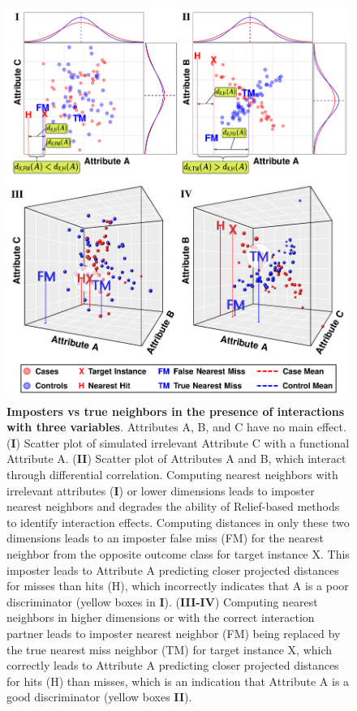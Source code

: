 \documentclass[10pt,letterpaper]{article}
\begin{document}
\begin{figure}[H]
	\centering
	\includegraphics[width=\textwidth]{2by2_arrangementABC.pdf}
	\caption{{\bf Imposters vs true neighbors in the presence of interactions with three variables}. Attributes A, B, and C have no main effect. (\textbf{\selectfont I}) Scatter plot of simulated irrelevant Attribute C with a functional Attribute A. (\textbf{\selectfont II}) Scatter plot of Attributes A and B, which interact through differential correlation. Computing nearest neighbors with irrelevant attributes (\textbf{\selectfont I}) or lower dimensions leads to imposter nearest neighbors and degrades the ability of Relief-based methods to identify interaction effects. Computing distances in only these two dimensions leads to an imposter false miss (FM) for the nearest neighbor from the opposite outcome class for target instance X. This imposter leads to Attribute A predicting closer projected distances for misses than hits (H), which incorrectly indicates that A is a poor discriminator (yellow boxes in \textbf{\selectfont I}). (\textbf{\selectfont III-IV}) Computing nearest neighbors in higher dimensions or with the correct interaction partner leads to imposter nearest neighbor (FM) being replaced by the true nearest miss neighbor (TM) for target instance X, which correctly leads to Attribute A predicting closer projected distances for hits (H) than misses, which is an indication that Attribute A is a good discriminator (yellow boxes \textbf{\selectfont II}).}\label{fig:ABC}
\end{figure}
\end{document}
